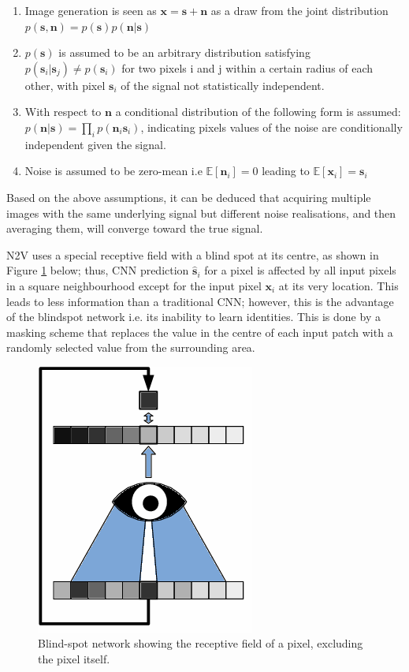 \begin{enumerate}
	\item Image generation is seen as ${\mathbf{x}} = {\mathbf{s}}+ {\mathbf{n}}$ as a draw from the joint distribution $p({\mathbf{s}},{\mathbf{n}}) = p({\mathbf{s}})p({\mathbf{n}}|{\mathbf{s}})$
	\item $p({\mathbf{s}})$ is assumed to be an arbitrary distribution satisfying $p({{\mathbf{s}}_i}|{{\mathbf{s}}_j}) \ne p({{\mathbf{s}}_i})$ for two pixels i and j within a certain radius of each other, with pixel ${{\mathbf{s}}_i}$ of the signal not statistically independent. \label{it:second}
	\item With respect to ${\mathbf{n}}$ a conditional distribution of the following form is assumed: $p({\mathbf{n}}|{\mathbf{s}}) = \prod\limits_i {p({{\mathbf{n}}_i}{{\mathbf{s}}_i})} $, indicating pixels values of the noise are conditionally independent given the signal.
	\item Noise is assumed to be zero-mean i.e $\mathbb{E}[{{\mathbf{n}}_i}] = 0$ leading to $\mathbb{E}[{{\mathbf{x}}_i}] = {{\mathbf{s}}_i}$ \label{it:fourth}
\end{enumerate}

Based on the above assumptions, it can be deduced that acquiring multiple images with the same underlying signal but different noise realisations, and then averaging them, will converge toward the true signal.

\gls{N2V} uses a special receptive field with a blind spot at its centre, as shown in Figure \ref{fig:blind} below; thus, \gls{CNN} prediction ${{\mathbf{\hat s}}_i}$ for a pixel is affected by all input pixels in a square neighbourhood except for the input pixel ${{\mathbf{x}}_i}$ at its very location. This leads to less information than a traditional \gls{CNN}; however, this is the advantage of the blindspot network i.e. its inability to learn identities. This is done by a masking scheme that replaces the value in the centre of each input patch with a randomly selected value from the surrounding area.

\begin{figure}[h!]
	\centering
	\includegraphics[width=0.3\linewidth]{3_Chapters//3_Chapter_Methodology//Figures/blindspot.png}
	\caption{Blind-spot network showing the receptive field of a pixel, excluding the pixel itself.}
	\label{fig:blind}
\end{figure}

